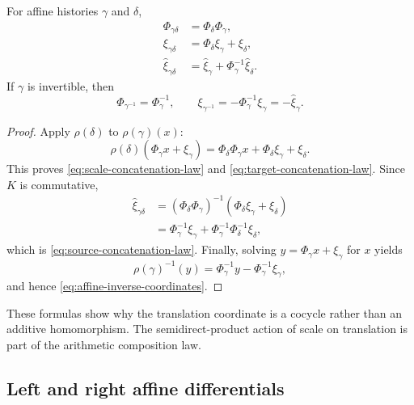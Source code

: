 \begin{proposition}
\label{prop:chronological-affine-cocycle-law}
For affine histories $\gamma$ and $\delta$,
\begin{align}
  \Phi_{\gamma\delta}
    &=\Phi_\delta\Phi_\gamma,
  \label{eq:scale-concatenation-law}\\
  \xi_{\gamma\delta}
    &=\Phi_\delta\xi_\gamma+\xi_\delta,
  \label{eq:target-concatenation-law}\\
  \widehat\xi_{\gamma\delta}
    &=\widehat\xi_\gamma
      +\Phi_\gamma^{-1}\widehat\xi_\delta.
  \label{eq:source-concatenation-law}
\end{align}
If $\gamma$ is invertible, then
\begin{equation}
  \Phi_{\gamma^{-1}}=\Phi_\gamma^{-1},
  \qquad
  \xi_{\gamma^{-1}}=-\Phi_\gamma^{-1}\xi_\gamma
  =-\widehat\xi_\gamma.
  \label{eq:affine-inverse-coordinates}
\end{equation}
\end{proposition}

\begin{proof}
Apply $\rho(\delta)$ to $\rho(\gamma)(x)$:
\[
  \rho(\delta)(\Phi_\gamma x+\xi_\gamma)
  =\Phi_\delta\Phi_\gamma x
   +\Phi_\delta\xi_\gamma+\xi_\delta.
\]
This proves \eqref{eq:scale-concatenation-law} and
\eqref{eq:target-concatenation-law}.  Since $K$ is commutative,
\begin{align*}
  \widehat\xi_{\gamma\delta}
  &=(\Phi_\delta\Phi_\gamma)^{-1}
    (\Phi_\delta\xi_\gamma+\xi_\delta)\\
  &=\Phi_\gamma^{-1}\xi_\gamma
    +\Phi_\gamma^{-1}\Phi_\delta^{-1}\xi_\delta,
\end{align*}
which is \eqref{eq:source-concatenation-law}.  Finally, solving
$y=\Phi_\gamma x+\xi_\gamma$ for $x$ yields
\[
  \rho(\gamma)^{-1}(y)
  =\Phi_\gamma^{-1}y-\Phi_\gamma^{-1}\xi_\gamma,
\]
and hence \eqref{eq:affine-inverse-coordinates}.
\end{proof}

These formulas show why the translation coordinate is a cocycle rather than
an additive homomorphism.  The semidirect-product action of scale on
translation is part of the arithmetic composition law.

\subsection{Left and right affine differentials}
\label{subsec:affine-maurer-cartan}


